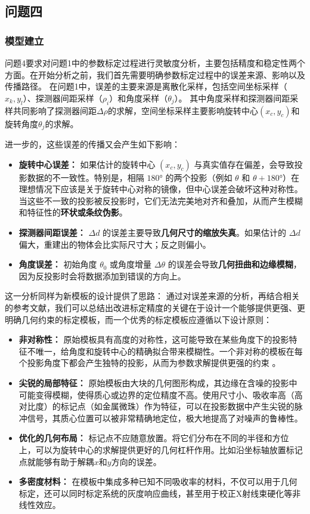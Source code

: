 \subsection{问题四}
\subsubsection{模型建立}
问题4要求对问题1中的参数标定过程进行灵敏度分析，主要包括精度和稳定性两个方面。在开始分析之前，我们首先需要明确参数标定过程中的误差来源、影响以及传播路径。
在问题1中，误差的主要来源是离散化采样，包括空间坐标采样（$x_k,y_l$）、探测器间距采样（$\rho_i$）和角度采样（$\theta_j$）。
其中角度采样和探测器间距采样共同影响了探测器间距$\Delta\rho$的求解，空间坐标采样主要影响旋转中心$(x_c,y_c)$和旋转角度$\theta_j$的求解。
\par
进一步的，这些误差的传播又会产生如下影响：
\begin{itemize}
    \item \textbf{旋转中心误差：} 如果估计的旋转中心 $(x_c,y_c)$ 与真实值存在偏差，会导致投影数据的不一致性。特别是，相隔 $180°$ 的两个投影（例如 $\theta$ 和 $\theta+180°$）在理想情况下应该是关于旋转中心对称的镜像，但中心误差会破坏这种对称性。当这些不一致的投影被反投影时，它们无法完美地对齐和叠加，从而产生模糊和特征性的\textbf{环状或条纹伪影}。  
    \item \textbf{探测器间距误差：} $\Delta d$ 的误差主要导致\textbf{几何尺寸的缩放失真}。如果估计的 $\Delta d$ 偏大，重建出的物体会比实际尺寸大；反之则偏小。  
    \item \textbf{角度误差：} 初始角度 $\theta_0$ 或角度增量 $\Delta\theta$ 的误差会导致\textbf{几何扭曲和边缘模糊}，因为反投影时会将数据添加到错误的方向上。
\end{itemize}

这一分析同样为新模板的设计提供了思路：
通过对误差来源的分析，再结合相关的参考文献，我们可以总结出改进标定精度的关键在于设计一个能够提供更强、更明确几何约束的标定模板，而一个优秀的标定模板应遵循以下设计原则：
\begin{itemize}
    \item \textbf{非对称性：} 原始模板具有高度的对称性，这可能导致在某些角度下的投影特征不唯一，给角度和旋转中心的精确拟合带来模糊性。一个非对称的模板在每个投影角度下都会产生独特的投影，从而为参数求解提供更强的约束 。  
    \item \textbf{尖锐的局部特征：} 原始模板由大块的几何图形构成，其边缘在含噪的投影中可能变得模糊，使得质心或边界的定位精度不高。使用尺寸小、吸收率高（高对比度）的标记点（如金属微珠）作为特征，可以在投影数据中产生尖锐的脉冲信号，其质心位置可以被非常精确地定位，极大地提高了对噪声的鲁棒性。  
    \item \textbf{优化的几何布局：} 标记点不应随意放置。将它们分布在不同的半径和方位上，可以为旋转中心的求解提供更好的几何杠杆作用。比如沿坐标轴放置标记点就能够有助于解耦$x$和$y$方向的误差。  
    \item \textbf{多密度材料：} 在模板中集成多种已知不同吸收率的材料，不仅可以用于几何标定，还可以同时标定系统的灰度响应曲线，甚至用于校正X射线束硬化等非线性效应。
\end{itemize}





